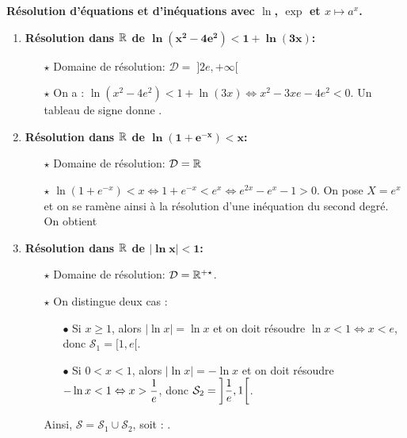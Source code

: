\documentclass[a4paper, 11pt]{article}
\begin{document}
\begin{correction}  \; \textbf{R\'esolution d'\'equations et d'in\'equations avec $\ln{}$, $\exp{}$ et $x\mapsto a^x$.}


\begin{enumerate}
\item \textbf{R\'esolution dans $\mathbf{\mathbb{R}}$ de $\mathbf{\ln{(x^2-4e^2)}<1+\ln{(3x)}}$:}\\
\noindent \begin{itemize}
\item[$\star$]  Domaine de r\'esolution: $\mathcal{D}= \; \rbrack 2e,+\infty\lbrack$
\item[$\star$]  On a : $\ln{(x^2-4e^2)}<1+\ln{(3x)}\Leftrightarrow x^2-3xe-4e^2<0$. Un tableau de signe donne \fbox{$\mathcal{S}= \; ]2 e, 4 e[$}.
\end{itemize}
\item \textbf{R\'esolution dans $\mathbf{\mathbb{R}}$ de $\mathbf{\ln{(1+e^{-x})}<x}$:}\\
\noindent \begin{itemize}
\item[$\star$]  Domaine de r\'esolution: $\mathcal{D}=\mathbb{R}$
\item[$\star$]  
$\ln{(1+e^{-x})}<x\Leftrightarrow 1+e^{-x}<e^x\Leftrightarrow e^{2x}-e^x-1>0$.
On pose $X=e^x$ et on se ram\`ene ainsi \`a la r\'esolution d'une in\'equation du second degr\'e. On obtient 
\end{itemize}
\item \textbf{R\'esolution dans $\mathbf{\mathbb{R}}$ de $\mathbf{|\ln{x}|<1}$:}\\
\noindent \begin{itemize}
\item[$\star$]  Domaine de r\'esolution: $\mathcal{D}=\mathbb{R}^{+\star}$.
\item[$\star$]  On distingue deux cas :
\begin{itemize}
\item[$\bullet$] Si $x\geq 1$, alors $|\ln{x}|=\ln{x}$ et on doit r\'esoudre $\ln{x}<1\Leftrightarrow x<e$, donc $\mathcal{S_1}= [1,e[$.
\item[$\bullet$] Si $0<x<1$, alors $|\ln{x}|=-\ln{x}$ et on doit r\'esoudre $-\ln{x}<1 \Leftrightarrow x>\displaystyle\frac{1}{e}$, donc $\mathcal{S}_2 = \displaystyle \left]\frac{1}{e} , 1 \right[$.
\end{itemize}
Ainsi, $\mathcal{S}=\mathcal{S}_1 \cup \mathcal{S}_2$, soit : .

\end{itemize}
\end{enumerate}
\end{correction}
\end{document}
